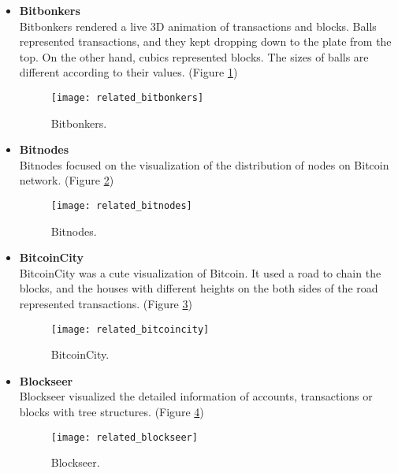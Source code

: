 \begin{itemize}
    \item \textbf{Bitbonkers} \cite{bitbonkers} \\
        Bitbonkers rendered a live 3D animation of transactions and blocks. Balls represented transactions, and they kept dropping down to the plate from the top. On the other hand, cubics represented blocks. The sizes of balls are different according to their values. (Figure \ref{fig:bitbonkers})
        \begin{figure}[htb]
            \centering
            \texttt{[image: related\_bitbonkers]}
            \caption{Bitbonkers.}
            \label{fig:bitbonkers}
        \end{figure}
    \item \textbf{Bitnodes} \cite{bitnodes} \\
        Bitnodes focused on the visualization of the distribution of nodes on Bitcoin network. (Figure \ref{fig:bitnodes})
        \begin{figure}[htb]
            \centering
            \texttt{[image: related\_bitnodes]}
            \caption{Bitnodes.}
            \label{fig:bitnodes}
        \end{figure}
    \clearpage
    \vspace*{\fill}
    \item \textbf{BitcoinCity} \cite{bitcoincity} \\
        BitcoinCity was a cute visualization of Bitcoin. It used a road to chain the blocks, and the houses with different heights on the both sides of the road represented transactions. (Figure \ref{fig:bitcoincity})
        \begin{figure}[htb]
            \centering
            \texttt{[image: related\_bitcoincity]}
            \caption{BitcoinCity.}
            \label{fig:bitcoincity}
        \end{figure}
    \item \textbf{Blockseer} \cite{blockseer} \\
        Blockseer visualized the detailed information of accounts, transactions or blocks with tree structures. (Figure \ref{fig:blockseer})
        \begin{figure}[htb]
            \centering
            \texttt{[image: related\_blockseer]}
            \caption{Blockseer.}
            \label{fig:blockseer}
        \end{figure}
    \vspace*{\fill}

\end{itemize}
